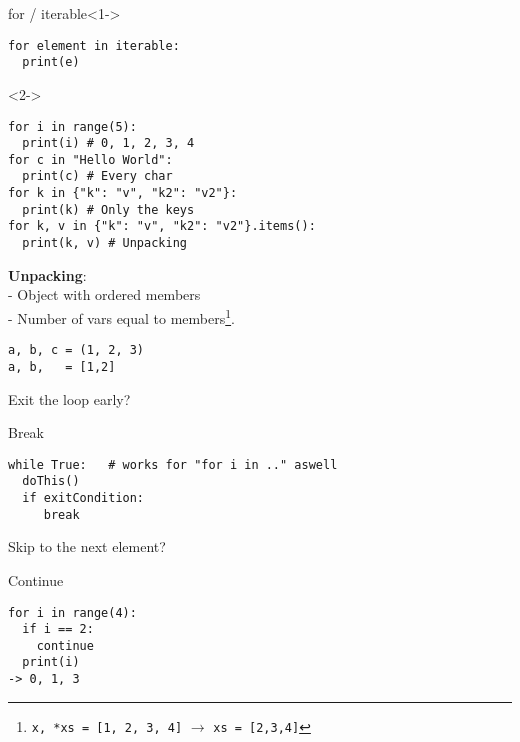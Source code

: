 \documentclass{beamer}
\begin{document}
\begin{frame}[fragile]
    \begin{block}{for / iterable}<1->
        \begin{verbatim}
for element in iterable:
  print(e)
        \end{verbatim}
    \end{block}
\begin{example}<2->
        \begin{verbatim}
for i in range(5):
  print(i) # 0, 1, 2, 3, 4
for c in "Hello World":
  print(c) # Every char
for k in {"k": "v", "k2": "v2"}:
  print(k) # Only the keys
for k, v in {"k": "v", "k2": "v2"}.items():
  print(k, v) # Unpacking
\end{verbatim}
\end{example}
\end{frame}

\begin{frame}[fragile]
\textbf{Unpacking}:\\
- Object with ordered members\\
- Number of vars equal to members\footnote{\texttt{x, *xs  = [1, 2, 3, 4]}  $\rightarrow$ \texttt{xs = [2,3,4]}}.
\begin{example}
    \begin{verbatim}
a, b, c = (1, 2, 3)
a, b,   = [1,2]
    \end{verbatim}
\end{example}
\end{frame}

\begin{frame}[fragile]
    Exit the loop early?
    \begin{block}{Break}
    \begin{verbatim}
while True:   # works for "for i in .." aswell
  doThis()
  if exitCondition:
     break
    \end{verbatim}
    \end{block}
    Skip to the next element?
    \begin{block}{Continue}
        \begin{verbatim}
for i in range(4):
  if i == 2:
    continue
  print(i)
-> 0, 1, 3
        \end{verbatim}
    \end{block}
\end{frame}
\end{document}
